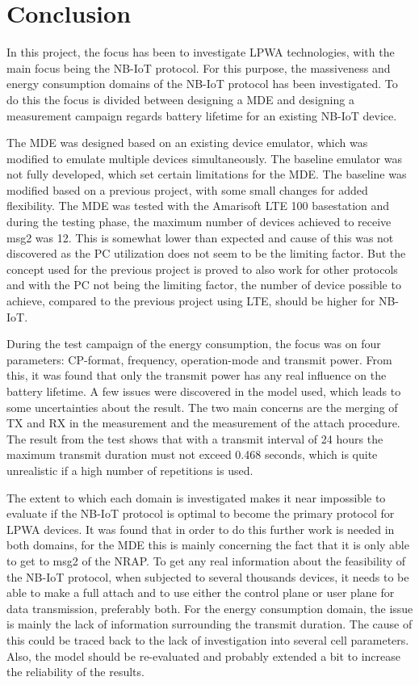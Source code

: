 \chapter{Conclusion}
\label{ch:con}
In this project, the focus has been to investigate LPWA technologies, with the main focus being the NB-IoT protocol. For this purpose, the massiveness and energy consumption domains of the NB-IoT protocol has been investigated. To do this the focus is divided between designing a MDE and designing a measurement campaign regards battery lifetime for an existing NB-IoT device. 

The MDE was designed based on an existing device emulator, which was modified to emulate multiple devices simultaneously. The baseline emulator was not fully developed, which set certain limitations for the MDE. The baseline was modified based on a previous project, with some small changes for added flexibility. The MDE was tested with the Amarisoft LTE 100 basestation and during the testing phase, the maximum number of devices achieved to receive msg2 was 12. This is somewhat lower than expected and cause of this was not discovered as the PC utilization does not seem to be the limiting factor. But the concept used for the previous project is proved to also work for other protocols and with the PC not being the limiting factor, the number of device possible to achieve, compared to the previous project using LTE, should be higher for NB-IoT.

During the test campaign of the energy consumption, the focus was on four parameters: CP-format, frequency, operation-mode and transmit power. From this, it was found that only the transmit power has any real influence on the battery lifetime. A few issues were discovered in the model used, which leads to some uncertainties about the result. The two main concerns are the merging of TX and RX in the measurement and the measurement of the attach procedure. The result from the test shows that with a transmit interval of 24 hours the maximum transmit duration must not exceed 0.468 seconds, which is quite unrealistic if a high number of repetitions is used. 

The extent to which each domain is investigated makes it near impossible to evaluate if the NB-IoT protocol is optimal to become the primary protocol for LPWA devices. It was found that in order to do this further work is needed in both domains, for the MDE this is mainly concerning the fact that it is only able to get to msg2 of the NRAP. To get any real information about the feasibility of the NB-IoT protocol, when subjected to several thousands devices, it needs to be able to make a full attach and to use either the control plane or user plane for data transmission, preferably both. For the energy consumption domain, the issue is mainly the lack of information surrounding the transmit duration. The cause of this could be traced back to the lack of investigation into several cell parameters. Also, the model should be re-evaluated and probably extended a bit to increase the reliability of the results. 




